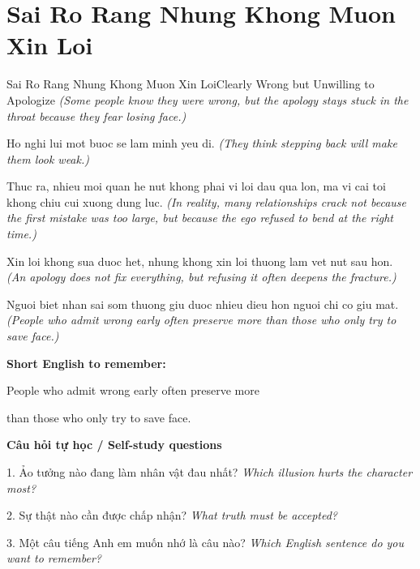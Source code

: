 \section{Sai Ro Rang Nhung Khong Muon Xin Loi}
\begin{truyen}{Sai Ro Rang Nhung Khong Muon Xin Loi}{Clearly Wrong but Unwilling to Apologize}
\textit{(Some people know they were wrong, but the apology stays stuck in the throat because they fear losing face.)}

Ho nghi lui mot buoc se lam minh yeu di.
\textit{(They think stepping back will make them look weak.)}

Thuc ra, nhieu moi quan he nut khong phai vi loi dau qua lon, ma vi cai toi khong chiu cui xuong dung luc.
\textit{(In reality, many relationships crack not because the first mistake was too large, but because the ego refused to bend at the right time.)}

Xin loi khong sua duoc het, nhung khong xin loi thuong lam vet nut sau hon.
\textit{(An apology does not fix everything, but refusing it often deepens the fracture.)}

\end{truyen}

\begin{baihoc}
Nguoi biet nhan sai som thuong giu duoc nhieu dieu hon nguoi chi co giu mat.
\textit{(People who admit wrong early often preserve more than those who only try to save face.)}
\end{baihoc}

\begin{ghinhoanh}
\textbf{Short English to remember:}

People who admit wrong early often preserve more

than those who only try to save face.

\end{ghinhoanh}

\begin{tuhocnhanh}
\textbf{Câu hỏi tự học / Self-study questions}

1. Ảo tưởng nào đang làm nhân vật đau nhất? \textit{Which illusion hurts the character most?}

2. Sự thật nào cần được chấp nhận? \textit{What truth must be accepted?}

3. Một câu tiếng Anh em muốn nhớ là câu nào? \textit{Which English sentence do you want to remember?}
\end{tuhocnhanh}
\ngancach

